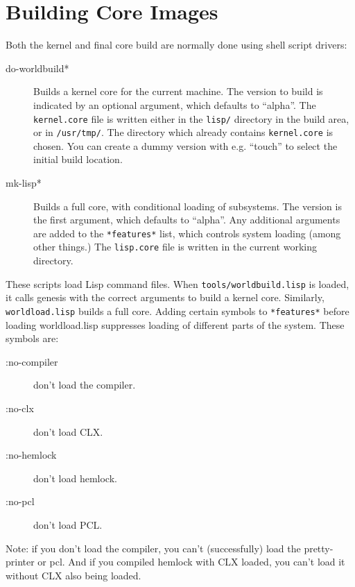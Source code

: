 \section{Building Core Images}
\label{building-cores}
Both the kernel and final core build are normally done using shell script
drivers:
\begin{description}
\item[do-worldbuild*] Builds a kernel core for the current machine.  The
version to build is indicated by an optional argument, which defaults to
``alpha''.  The \verb|kernel.core| file is written either in the \verb|lisp/|
directory in the build area, or in \verb|/usr/tmp/|.  The directory which
already contains \verb|kernel.core| is chosen.  You can create a dummy version
with e.g. ``touch'' to select the initial build location.

\item[mk-lisp*] Builds a full core, with conditional loading of subsystems.
The version is the first argument, which defaults to ``alpha''.  Any additional
arguments are added to the \verb|*features*| list, which controls system
loading (among other things.)  The \verb|lisp.core| file is written in the
current working directory.
\end{description}

These scripts load Lisp command files.  When \verb|tools/worldbuild.lisp| is
loaded, it calls genesis with the correct arguments to build a kernel core.
Similarly, \verb|worldload.lisp|
builds a full core.  Adding certain symbols to \verb|*features*| before
loading worldload.lisp suppresses loading of different parts of the
system.  These symbols are:
\begin{description}
\item[:no-compiler] don't load the compiler.
\item[:no-clx] don't load CLX.
\item[:no-hemlock] don't load hemlock.
\item[:no-pcl] don't load PCL.
\end{description}

Note: if you don't load the compiler, you can't (successfully) load the
pretty-printer or pcl.  And if you compiled hemlock with CLX loaded, you can't
load it without CLX also being loaded.

